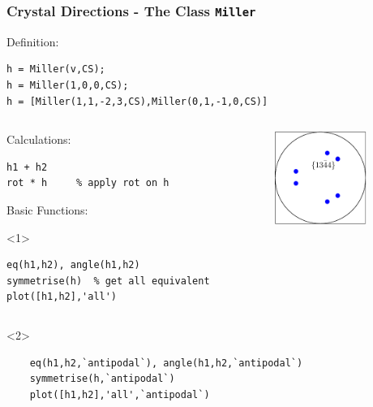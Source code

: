 \begin{frame}[fragile]
  \frametitle{Crystal Directions - The \MTEX Class \texttt{\bf Miller}}

  Definition:

\begin{lstlisting}
h = Miller(v,CS);
h = Miller(1,0,0,CS);
h = [Miller(1,1,-2,3,CS),Miller(0,1,-1,0,CS)]
\end{lstlisting}

\medskip

\begin{columns}
  \begin{column}{8.5cm}

    Calculations:

\begin{lstlisting}
h1 + h2
rot * h     % apply rot on h
\end{lstlisting}

    Basic Functions:

    \begin{onlyenv}<1>
\begin{lstlisting}
eq(h1,h2), angle(h1,h2)
symmetrise(h)  % get all equivalent
plot([h1,h2],'all')
\end{lstlisting}
    \end{onlyenv}

	\end{column}

  \begin{column}{3cm}
    \includegraphics[width=3cm]{pic/miller}
  \end{column}
\end{columns}


	\begin{onlyenv}


	\begin{lstlisting}
	eq(h1,h2,`antipodal`), angle(h1,h2,`antipodal`)
	symmetrise(h,`antipodal`)
	plot([h1,h2],'all',`antipodal`)
	\end{lstlisting}


    \end{onlyenv}


\end{frame}



